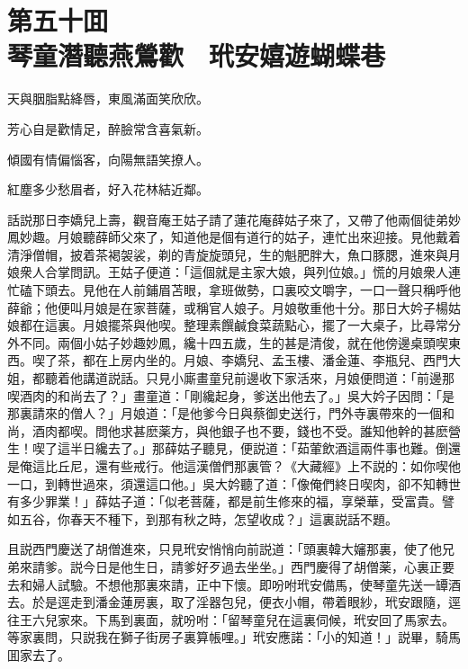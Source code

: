 
\chapter*{第五十囬　\\琴童潛聽燕鶯歡　玳安嬉遊蝴蝶巷}


\begin{myquote}
天與胭脂點絳唇，東風滿面笑欣欣。

芳心自是歡情足，醉臉常含喜氣新。

傾國有情偏惱客，向陽無語笑撩人。

紅塵多少愁眉者，好入花林結近鄰。
\end{myquote}

話説那日李嬌兒上壽，觀音庵王姑子請了蓮花庵薛姑子來了，又帶了他兩個徒弟妙鳳妙趣。月娘聽薛師父來了，知道他是個有道行的姑子，連忙出來迎接。見他戴着清淨僧帽，披着茶褐袈裟，剃的青旋旋頭兒，生的魁肥胖大，魚口豚腮，進來與月娘衆人合掌問訊。王姑子便道：「這個就是主家大娘，與列位娘。」慌的月娘衆人連忙磕下頭去。見他在人前鋪眉苫眼，拿班做勢，口裏咬文嚼字，一口一聲只稱呼他薛爺；他便叫月娘是在家菩薩，或稱官人娘子。月娘敬重他十分。那日大妗子楊姑娘都在這裏。月娘擺茶與他喫。整理素饌鹹食菜蔬點心，擺了一大桌子，比尋常分外不同。兩個小姑子妙趣妙鳳，纔十四五歲，生的甚是清俊，就在他傍邊桌頭喫東西。喫了茶，都在上房内坐的。月娘、李嬌兒、孟玉樓、潘金蓮、李瓶兒、西門大姐，都聽着他講道説話。只見小廝畫童兒前邊收下家活來，月娘便問道：「前邊那喫酒肉的和尚去了？」畫童道：「剛纔起身，爹送出他去了。」吳大妗子因問：「是那裏請來的僧人？」月娘道：「是他爹今日與蔡御史送行，門外寺裏帶來的一個和尚，酒肉都喫。問他求甚麽薬方，與他銀子也不要，錢也不受。誰知他幹的甚麽營生！喫了這半日纔去了。」那薛姑子聽見，便説道：「茹葷飲酒這兩件事也難。倒還是俺這比丘尼，還有些戒行。他這漢僧們那裏管？《大藏經》上不説的：如你喫他一口，到轉世過來，須還這口他。」吳大妗聽了道：「像俺們終日喫肉，卻不知轉世有多少罪業！」薛姑子道：「似老菩薩，都是前生修來的福，享榮華，受富貴。譬如五谷，你春天不種下，到那有秋之時，怎望收成？」這裏説話不題。

且説西門慶送了胡僧進來，只見玳安悄悄向前説道：「頭裏韓大嬸那裏，使了他兄弟來請爹。説今日是他生日，請爹好歹過去坐坐。」西門慶得了胡僧薬，心裏正要去和婦人試驗。不想他那裏來請，正中下懷。即吩咐玳安備馬，使琴童先送一罈酒去。於是逕走到潘金蓮房裏，取了淫器包兒，便衣小帽，帶着眼紗，玳安跟隨，逕往王六兒家來。下馬到裏面，就吩咐：「留琴童兒在這裏伺候，玳安回了馬家去。等家裏問，只説我在獅子街房子裏算帳哩。」玳安應諾：「小的知道！」説畢，騎馬囬家去了。

